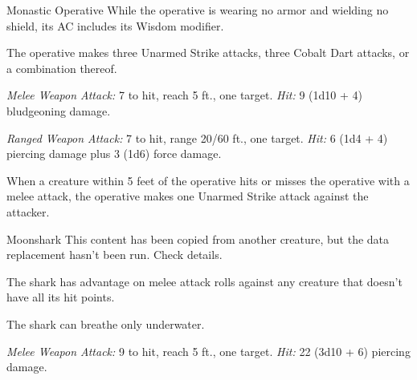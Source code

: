 \documentclass[10pt,a4paper,twoside,bg=print,twocolumn,openany,nodeprecatedcode]{dndbook}
\begin{document}
\begin{DndMonster}[float=t]{Monastic Operative}
\DndMonsterBasics[
armor-class = {17 (Unarmored Defense)},
hit-points = {\DndDice{13d8 + 26}},
speed = {40 ft.}
]
\DndMonsterAbilityScores[
 str = 13,
 dex = 18,
 con = 14,
 int = 14,
 wis = 17,
 cha = 11
]
\DndMonsterDetails[
saving-throws = {Dex +7, Wis +6},
skills = {Acrobatics +7, Insight +6, Investigation +8, Stealth +7},
languages = {Common plus two other languages},
challenge = 5,
]
While the operative is wearing no armor and wielding no shield, its AC includes its Wisdom modifier.

The operative makes three Unarmed Strike attacks, three Cobalt Dart attacks, or a combination thereof.

\textsl{Melee Weapon Attack:} 7 to hit, reach 5 ft., one target. \textsl{Hit:} 9 (1d10 + 4) bludgeoning damage.

\textsl{Ranged Weapon Attack:} 7 to hit, range 20/60 ft., one target. \textsl{Hit:} 6 (1d4 + 4) piercing damage plus 3 (1d6) force damage.

When a creature within 5 feet of the operative hits or misses the operative with a melee attack, the operative makes one Unarmed Strike attack against the attacker.

\end{DndMonster}



\begin{DndMonster}[float=t]{Moonshark}
\DndMonsterBasics[
armor-class = {13 (natural armor)},
hit-points = {\DndDice{11d12 + 55}},
speed = {0 ft., swim 50 ft.}
]
\DndMonsterAbilityScores[
 str = 23,
 dex = 11,
 con = 21,
 int = 1,
 wis = 10,
 cha = 5
]
\DndMonsterDetails[
skills = {Perception +3},
senses = {blindsight 60 ft., passive perception 13},
challenge = 5,
]
This content has been copied from another creature, but the data replacement hasn't been run. Check details.

The shark has advantage on melee attack rolls against any creature that doesn't have all its hit points.

The shark can breathe only underwater.

\textsl{Melee Weapon Attack:} 9 to hit, reach 5 ft., one target. \textsl{Hit:} 22 (3d10 + 6) piercing damage.

\end{DndMonster}
\end{document}
